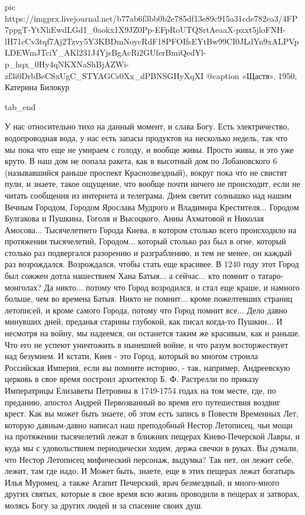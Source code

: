		 pic https://imgprx.livejournal.net/b77ab6f3bb0b2e785df13e89c915a31cde782ea3/4FP7ppgT-YtNhEwdLGd1_0aokx1X9JZ0Pp-EFpRoUTQSrtAeaaX-pxxt5jloFNH-lH71cCv3tqf7Aj2Tzvy5Y3KBDmNoycRdF18PFOIfsEYtBw99CI0JLdYn9xALPVpLDEWmJTciY_AKl231J4YjsBgAcRi2GUferBmiQedYl-p_hqx_0Hy4qNKXNaShBjAZWi-zf3i0DrbBeCSxUgC_STYAGCs0Xx_dPBNSGHyXqXI
		 @caption «Щастя», 1950, Катерина Билокур

  tab_end
\fi

У нас относительно тихо на данный момент,
и слава Богу. Есть электричество, водопроводная вода, у нас есть запасы
продуктов на несколько недель, так что мы пока что еще не умираем с голоду, и
вообще живы. Просто живы, и это уже круто.  В наш дом не попала ракета, как в
высотный дом по Лобановского 6 (называвшийся раньше проспект Краснозвездный),
вокруг пока что не свистят пули, и знаете, такое ощущение, что вообще почти
ничего не происходит, если не читать сообщения из интернета и телеграма.  Днем
светит солнышко над нашим Вечным Городом, Городом Ярослава Мудрого и Владимира
Крестителя... Городом Булгакова и Пушкина, Гоголя и Высоцкого, Анны Ахматовой и
Николая Амосова...  Тысячелетнего Города Киева, в котором столько всего
происходило на протяжении тысячелетий, Городом... который столько раз был в
огне, который столько раз подвергался разорению и разграблению, и тем не менее,
он каждый раз возрождался.  Возрождался, чтобы стать еще красивее. В 1240 году
этот Город был сожжен дотла нашествием Хана Батыя... а сейчас... кто помнит о
татаро-монголах?  Да никто...  потому что Город возродился, и стал еще краше, и
намного больше, чем во времена Батыя.  Никто не помнит... кроме пожелтевших
страниц летописей, и кроме самого Города, потому что Город помнит все... Дело
давно минувших дней, преданья старины глубокой, как писал когда-то Пушкин... И
несмотря на войну, мы надеемся, он останется таким же красивым, как и раньше.
Что его не успеют уничтожить в нынешней войне, и что разум восторжествует над
безумием.  И кстати, Киев - это Город, который во многом строила Российская
Империя, если вы помните историю, - так, например, Андреевскую церковь в свое
время построил архитектор Б. Ф. Растрелли по приказу Императрицы Елизаветы
Петровны в 1749-1754 годах на том месте, где, по преданию, апостол Андрей
Первозванный во время его путешествия воздвиг крест. Как вы может быть знаете,
об этом есть запись в Повести Временных Лет, которую давным-давно написал наш
преподобный Нестор Летописец, чьи мощи на протяжении тысячелетий лежат в
ближних пещерах Киево-Печерской Лавры, и куда мы с удовольствием периодически
ходим, держа свечки в руках. Вы думали, что Нестор Летописец мифический
персонаж, выдумка? Так нет, он лежит себе, лежит, там где надо.  И Может быть,
знаете, еще в этих пещерах лежат богатырь Илья Муромец, а также Агапит
Печерский, врач безмездный, и много-много других святых, которые в свое время
всю жизнь проводили в пещерах и затворах, молясь Богу за других людей и за
спасение своих душ.

